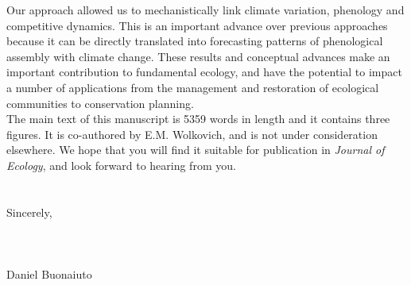 \documentclass[11.5 pt]{article}
\begin{document}
\noindent Our approach allowed us to mechanistically link climate variation, phenology and competitive dynamics. This is an important advance over previous approaches because it can be directly translated into forecasting patterns of phenological assembly with climate change. These results and conceptual advances make an important contribution to fundamental ecology, and have the potential to impact a number of applications from the management and restoration of ecological communities to conservation planning.\\

\noindent The main text of this manuscript is 5359 words in length and it contains three figures. It is co-authored by E.M. Wolkovich, and is not under consideration elsewhere. We hope that you will find it suitable for publication in \textit{Journal of Ecology}, and look forward to hearing from you.\\\\ 
\\Sincerely,\\\\\\\\

\noindent Daniel Buonaiuto\\


\end{document}
